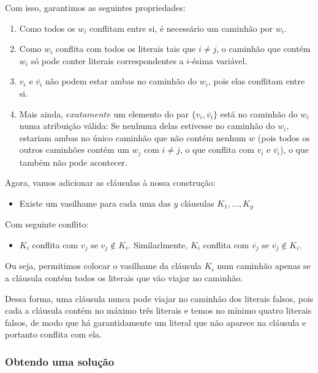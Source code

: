 \documentclass[11pt]{article}
\begin{document}
Com isso, garantimos as seguintes propriedades:

\begin{enumerate}[($P_1$)]
\item Como todos os $w_i$ conflitam entre si, é necessário um
caminhão por $w_i$.

\item Como $w_i$ conflita com todos os literais tais que
$i \neq j$, o caminhão que contém $w_i$ só pode conter literais
correspondentes a $i$-ésima variável.

\item $v_i$ e $\overline{v_i}$ não
podem estar ambas no caminhão do $w_i$, pois elas conflitam entre si.

\item Mais ainda, $\textit{exatamente}$ um elemento do par $\{v_i,
\overline{v_i}\}$ está no caminhão do $w_i$ numa atribuição válida: Se
nenhuma delas estivesse no caminhão do $w_i$, estariam ambas no único
caminhão que não contém nenhum $w$ (pois todos os outros caminhões
contém um $w_j$ com $i \neq j$, o que conflita com $v_i$ e
$\overline{v_i}$), o que também não pode acontecer.
\end{enumerate}



Agora, vamos adicionar as cláusulas à nossa construção:

\begin{itemize}
\item Existe um vasilhame para cada uma das $y$ cláusulas $K_1, \ldots, K_y$
\end{itemize}

Com seguinte conflito:

\begin{itemize}
\item $K_i$ conflita com $v_j$ se $v_j \not\in K_i$. Similarlmente, $K_i$
  conflita com $\overline{v_j}$ se $\overline{v_j} \not\in K_i$.
\end{itemize}

Ou seja, permitimos colocar o vasilhame da cláusula $K_i$ num caminhão
apenas se a cláusula contém todos os literais que vão viajar no
caminhão.

Dessa forma, uma cláusula nunca pode viajar no caminhão dos literais
falsos, pois cada a cláusula contém no máximo três literais e temos no
mínimo quatro literais falsos, de modo que há garantidamente um
literal que não aparece na cláusula e portanto conflita com ela.

\subsubsection{Obtendo uma solução}
\label{sec-3-2-2}
\end{document}
